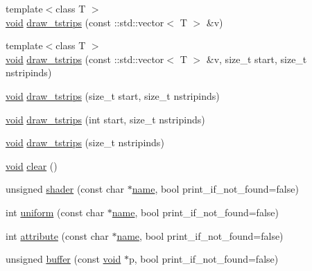 \begin{DoxyCompactItemize}
\item 
{\footnotesize template$<$class T $>$ }\\\hyperlink{namespacetrimesh_a784ddfd979e1c579bda795a8edfc3f43}{void} \hyperlink{classtrimesh_1_1GLManager_a4024aae986ab0de59995e2ae3bcfc897}{draw\+\_\+tstrips} (const \+::std\+::vector$<$ T $>$ \&v)
\item 
{\footnotesize template$<$class T $>$ }\\\hyperlink{namespacetrimesh_a784ddfd979e1c579bda795a8edfc3f43}{void} \hyperlink{classtrimesh_1_1GLManager_aef32ea105fa2693839e616b46e1ff716}{draw\+\_\+tstrips} (const \+::std\+::vector$<$ T $>$ \&v, size\+\_\+t start, size\+\_\+t nstripinds)
\item 
\hyperlink{namespacetrimesh_a784ddfd979e1c579bda795a8edfc3f43}{void} \hyperlink{classtrimesh_1_1GLManager_a07b0be4cfb5ae278f49693b009d41367}{draw\+\_\+tstrips} (size\+\_\+t start, size\+\_\+t nstripinds)
\item 
\hyperlink{namespacetrimesh_a784ddfd979e1c579bda795a8edfc3f43}{void} \hyperlink{classtrimesh_1_1GLManager_abad080bf1631cc4703937e46c8c1b7b6}{draw\+\_\+tstrips} (int start, size\+\_\+t nstripinds)
\item 
\hyperlink{namespacetrimesh_a784ddfd979e1c579bda795a8edfc3f43}{void} \hyperlink{classtrimesh_1_1GLManager_a7cf13fe0eec1dd106ff2d55099f49fc5}{draw\+\_\+tstrips} (size\+\_\+t nstripinds)
\item 
\hyperlink{namespacetrimesh_a784ddfd979e1c579bda795a8edfc3f43}{void} \hyperlink{classtrimesh_1_1GLManager_ada5d1ddf3796de2c9c9b3b6ec5289335}{clear} ()
\item 
unsigned \hyperlink{classtrimesh_1_1GLManager_a4bc553b4af1b1bb30416b892650b0f9c}{shader} (const char $\ast$\hyperlink{namespacetrimesh_a7f24cdcfa73387d7fa6aa44676238a79}{name}, bool print\+\_\+if\+\_\+not\+\_\+found=false)
\item 
int \hyperlink{classtrimesh_1_1GLManager_a4a646dab9afe96f525fde2844482f898}{uniform} (const char $\ast$\hyperlink{namespacetrimesh_a7f24cdcfa73387d7fa6aa44676238a79}{name}, bool print\+\_\+if\+\_\+not\+\_\+found=false)
\item 
int \hyperlink{classtrimesh_1_1GLManager_a72c6db539d2ede9501b40def6bd572c7}{attribute} (const char $\ast$\hyperlink{namespacetrimesh_a7f24cdcfa73387d7fa6aa44676238a79}{name}, bool print\+\_\+if\+\_\+not\+\_\+found=false)
\item 
unsigned \hyperlink{classtrimesh_1_1GLManager_a708081b8afa4e053ab5845fe64b64f70}{buffer} (const \hyperlink{namespacetrimesh_a784ddfd979e1c579bda795a8edfc3f43}{void} $\ast$p, bool print\+\_\+if\+\_\+not\+\_\+found=false)

\end{DoxyCompactItemize}
